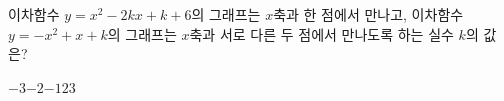 이차함수 $y=x^2-2kx+k+6$의 그래프는 $x$축과 한 점에서 만나고, 이차함수 $y=-x^2+x+k$의 그래프는 $x$축과 서로 다른 두 점에서 만나도록 하는 실수 $k$의 값은?
\begin{choices32}{$-3$}{$-2$}{$-1$}{$2$}{$3$}\end{choices32}
